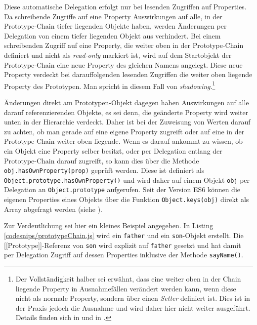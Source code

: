 Diese automatische Delegation erfolgt nur bei lesenden Zugriffen auf Properties. Da schreibende Zugriffe auf eine Property Auswirkungen auf alle, in der Prototype-Chain tiefer liegenden Objekte haben, werden Änderungen per Delegation von einem tiefer liegenden Objekt aus verhindert. Bei einem schreibenden Zugriff auf eine Property, die weiter oben in der Prototype-Chain definiert und nicht als \emph{read-only} markiert ist, wird auf dem Startobjekt der Prototype-Chain eine neue Property des gleichen Namens angelegt. Diese neue Property verdeckt bei darauffolgenden lesenden Zugriffen die weiter oben liegende Property des Prototypen. Man spricht in diesem Fall von \emph{shadowing}.\footnote{Der Vollständigkeit halber sei erwähnt, dass eine weiter oben in der Chain liegende Property in Ausnahmefällen verändert werden kann, wenn diese nicht als normale Property, sondern über einen \emph{Setter} definiert ist. Dies ist in der Praxis jedoch die Ausnahme und wird daher hier nicht weiter ausgeführt. Details finden sich in \citep[p. 88f.]{SimpsonThisobjectprototypes2014} und in \citep{international2018ecmascript}.}

Änderungen direkt am Prototypen-Objekt dagegen haben Auswirkungen auf alle darauf referenzierenden Objekte, es sei denn, die geänderte Property wird weiter unten in der Hierarchie verdeckt. Daher ist bei der Zuweisung von Werten darauf zu achten, ob man gerade auf eine eigene Property zugreift oder auf eine in der Prototype-Chain weiter oben liegende. 
Wenn es darauf ankommt zu wissen, ob ein Objekt eine Property selber besitzt, oder per Delegation entlang der Prototype-Chain darauf zugreift, so kann dies über die Methode \texttt{obj.hasOwnProperty(prop)} geprüft werden. Diese ist definiert als \texttt{Object.proto\-type.hasOwnProperty()} und wird daher auf einem Objekt \texttt{obj} per Delegation an \texttt{Object.prototype} aufgerufen. Seit der Version ES6  können die eigenen Properties eines Objekts über die Funktion \texttt{Object.keys(obj)} direkt als Array abgefragt werden (siehe \citep[§19.1.2.16]{international2018ecmascript}).%

\skippingparagraph


Zur Verdeutlichung sei hier ein kleines Beispiel angegeben. In Listing \ref{codesnips/prototypeChain.js} wird ein \texttt{father} und ein \texttt{son}-Objekt erstellt. Die [[Prototype]]-Referenz von \texttt{son} wird explizit auf \texttt{father} gesetzt und hat damit per Delegation Zugriff auf dessen Properties inklusive der Methode \texttt{sayName()}. 

